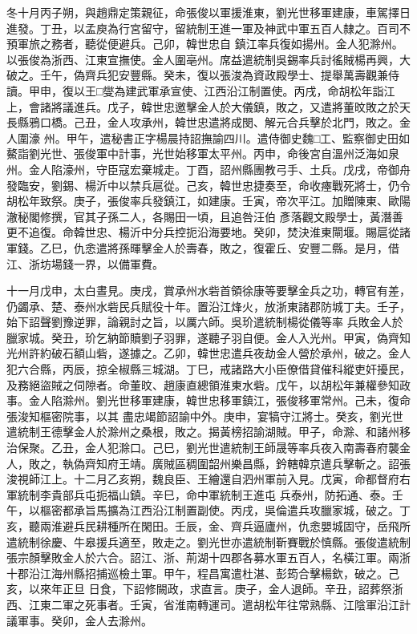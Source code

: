 \begin{pinyinscope}
 冬十月丙子朔，與趙鼎定策親征，命張俊以軍援淮東，劉光世移軍建康，車駕擇日進發。丁丑，以孟庾為行宮留守，留統制王進一軍及神武中軍五百人隸之。百司不預軍旅之務者，聽從便避兵。己卯，韓世忠自
 鎮江率兵復如揚州。金人犯滁州。以張俊為浙西、江東宣撫使。金人圍亳州。席益遣統制吳錫率兵討徭賊楊再興，大破之。壬午，偽齊兵犯安豐縣。癸未，復以張浚為資政殿學士、提舉萬壽觀兼侍讀。甲申，復以王□燮為建武軍承宣使、江西沿江制置使。丙戌，命胡松年詣江上，會諸將議進兵。戊子，韓世忠邀擊金人於大儀鎮，敗之，又遣將董旼敗之於天長縣鴉口橋。己丑，金人攻承州，韓世忠遣將成閔、解元合兵擊於北門，敗之。金人圍濠
 州。甲午，遣秘書正字楊晨持詔撫諭四川。遣侍御史魏□工、監察御史田如鰲詣劉光世、張俊軍中計事，光世始移軍太平州。丙申，命後宮自溫州泛海如泉州。金人陷濠州，守臣寇宏棄城走。丁酉，詔州縣團教弓手、土兵。戊戌，帝御舟發臨安，劉錫、楊沂中以禁兵扈從。己亥，韓世忠捷奏至，命收瘞戰死將士，仍令胡松年致祭。庚子，張俊率兵發鎮江，如建康。壬寅，帝次平江。加贈陳東、歐陽澈秘閣修撰，官其子孫二人，各賜田一頃，且追咎汪伯
 彥落觀文殿學士，黃潛善更不追復。命韓世忠、楊沂中分兵控扼沿海要地。癸卯，焚決淮東閘堰。賜扈從諸軍錢。乙巳，仇悆遣將孫暉擊金人於壽春，敗之，復霍丘、安豐二縣。是月，借江、浙坊場錢一界，以備軍費。



 十一月戊申，太白晝見。庚戌，賞承州水砦首領徐康等要擊金兵之功，轉官有差，仍蠲承、楚、泰州水砦民兵賦役十年。置沿江烽火，放浙東諸郡防城丁夫。壬子，始下詔聲劉豫逆罪，論親討之旨，以厲六師。吳玠遣統制楊從儀等率
 兵敗金人於臘家城。癸丑，玠乞納節贖劉子羽罪，遂聽子羽自便。金人入光州。甲寅，偽齊知光州許約破石額山砦，遂據之。乙卯，韓世忠遣兵夜劫金人營於承州，破之。金人犯六合縣，丙辰，掠全椒縣三城湖。丁巳，戒諸路大小臣僚借貸催科縱吏奸擾民，及務絕盜賊之伺隙者。命董旼、趙康直總領淮東水砦。戊午，以胡松年兼權參知政事。金人陷滁州。劉光世移軍建康，韓世忠移軍鎮江，張俊移軍常州。己未，復命張浚知樞密院事，以其
 盡忠竭節詔諭中外。庚申，宴犒守江將士。癸亥，劉光世遣統制王德擊金人於滁州之桑根，敗之。揭黃榜招諭湖賊。甲子，命滁、和諸州移治保聚。乙丑，金人犯滁口。己巳，劉光世遣統制王師晟等率兵夜入南壽春府襲金人，敗之，執偽齊知府王靖。廣賊區稠圍韶州樂昌縣，鈐轄韓京遣兵擊斬之。詔張浚視師江上。十二月乙亥朔，魏良臣、王繪還自泗州軍前入見。戊寅，命都督府右軍統制李貴部兵屯扼福山鎮。辛巳，命中軍統制王進屯
 兵泰州，防拓通、泰。壬午，以樞密都承旨馬擴為江西沿江制置副使。丙戌，吳倫遣兵攻臘家城，破之。丁亥，聽兩淮避兵民耕種所在閑田。壬辰，金、齊兵逼廬州，仇悆嬰城固守，岳飛所遣統制徐慶、牛皋援兵適至，敗走之。劉光世亦遣統制靳賽戰於慎縣。張俊遣統制張宗顏擊敗金人於六合。詔江、浙、荊湖十四郡各募水軍五百人，名橫江軍。兩浙十郡沿江海州縣招捕巡檢土軍。甲午，程昌寓遣杜湛、彭筠合擊楊欽，破之。己亥，以來年正旦
 日食，下詔修闕政，求直言。庚子，金人退師。辛丑，詔葬祭浙西、江東二軍之死事者。壬寅，省淮南轉運司。遣胡松年往常熟縣、江陰軍沿江計議軍事。癸卯，金人去滁州。



\end{pinyinscope}
